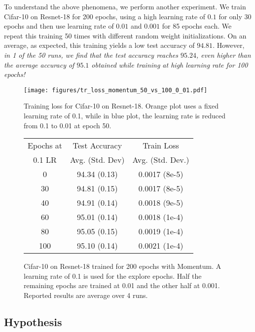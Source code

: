 \documentclass[twoside,11pt]{article}
\begin{document}
To understand the above phenomena, we perform another experiment. We train Cifar-10 on Resnet-18 for 200 epochs, using a high learning rate of $0.1$ for only 30 epochs and then use learning rate of $0.01$ and $0.001$ for 85 epochs each. We repeat this training 50 times with different random weight initializations. On an average, as expected, this training yields a low test accuracy of $94.81$. However, {\it in 1 of the 50 runs, we find that the test accuracy reaches $95.24$, even higher than the average accuracy of $95.1$ obtained while training at high learning rate for 100 epochs!}

\begin{figure*}[ht]
\begin{minipage}{0.45\textwidth}
  \centering
\texttt{[image: figures/tr\_loss\_momentum\_50\_vs\_100\_0\_01.pdf]}
  \caption{Training loss for Cifar-10 on Resnet-18. Orange plot uses a fixed learning rate of 0.1, while in blue plot, the learning rate is reduced from 0.1 to 0.01 at epoch 50.
}
  \label{fig:cifar-trloss-warmup50vs100}
\end{minipage}
\hfil
\begin{minipage}{0.5\textwidth}
  \centering
  \small
  \captionsetup{type=table} \caption{Cifar-10 on Resnet-18 trained for 200 epochs with Momentum. A learning rate of 0.1 is used for the explore epochs. Half the remaining epochs are trained at 0.01 and the other half at 0.001. Reported results are average over 4 runs.}
\begin{tabular}{ccc}
\toprule
Epochs at & Test Accuracy & Train Loss \\ 
0.1 LR &  Avg. (Std. Dev) &  Avg. (Std. Dev.)\\
\midrule
    0 & 94.34 (0.13) & 0.0017 (8e-5) \\
    30 & 94.81 (0.15) & 0.0017 (8e-5) \\
    40 & 94.91 (0.14) & 0.0018 (9e-5) \\
    60 & 95.01 (0.14) & 0.0018 (1e-4) \\ 
    80 & 95.05 (0.15)  & 0.0019 (1e-4) \\
    100 & 95.10 (0.14)  & 0.0021 (1e-4) \\
\bottomrule
\end{tabular}
  \label{tab:warmup_accuracy_baseline}
\end{minipage}
\end{figure*}






\subsection{Hypothesis}
\end{document}
